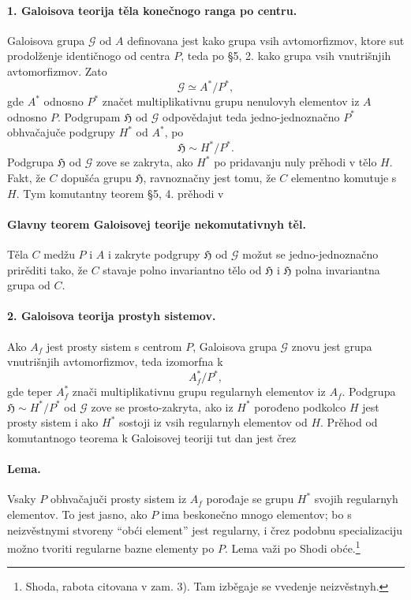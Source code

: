\documentclass[11pt]{article}
\providecommand{\Gcal}{\mathcal G}
\providecommand{\glqq}{``}
\providecommand{\grqq}{''}
\begin{document}
\paragraph{1. Galoisova teorija těla konečnogo ranga po centru.}
Galoisova grupa \(\Gcal\) od \(A\) definovana jest kako grupa vsih avtomorfizmov, ktore sut prodolženje identičnogo od centra \(P\), teda po §5, 2. kako grupa vsih vnutrišnjih avtomorfizmov. Zato
\[
        \Gcal \simeq A^*/P^*,
\]
gde \(A^*\) odnosno \(P^*\) značet multiplikativnu grupu nenulovyh elementov iz \(A\) odnosno \(P\). Podgrupam \(\mathfrak H\) od \(\Gcal\) odpovědajut teda jedno-jednoznačno \(P^*\) obhvačajuče podgrupy \(H^*\) od \(A^*\), po
\[
        \mathfrak H \sim H^*/P^* .
\]
Podgrupa \(\mathfrak H\) od \(\Gcal\) zove se zakryta, ako \(H^*\) po pridavanju nuly prěhodi v tělo \(H\). Fakt, že \(C\) dopušća grupu \(\mathfrak H\), ravnoznačny jest tomu, že \(C\) elementno komutuje s \(H\). Tym komutantny teorem §5, 4. prěhodi v

\paragraph{Glavny teorem Galoisovej teorije nekomutativnyh těl.}
Těla \(C\) medžu \(P\) i \(A\) i zakryte podgrupy \(\mathfrak H\) od \(\Gcal\) možut se jedno-jednoznačno prirěditi tako, že \(C\) stavaje polno invariantno tělo od \(\mathfrak H\) i \(\mathfrak H\) polna invariantna grupa od \(C\).

\paragraph{2. Galoisova teorija prostyh sistemov.}
Ako \(A_f\) jest prosty sistem s centrom \(P\), Galoisova grupa \(\Gcal\) znovu jest grupa vnutrišnjih avtomorfizmov, teda izomorfna k
\[
        A_f^*/P^*,
\]
gde teper \(A_f^*\) znači multiplikativnu grupu regularnyh elementov iz \(A_f\). Podgrupa \(\mathfrak H\sim H^*/P^*\) od \(\Gcal\) zove se prosto-zakryta, ako iz \(H^*\) porođeno podkolco \(H\) jest prosty sistem i ako \(H^*\) sostoji iz vsih regularnyh elementov od \(H\). Prěhod od komutantnogo teorema k Galoisovej teoriji tut dan jest črez

\paragraph{Lema.}
Vsaky \(P\) obhvačajuči prosty sistem iz \(A_f\) porođaje se grupu \(H^*\) svojih regularnyh elementov. To jest jasno, ako \(P\) ima beskonečno mnogo elementov; bo s neizvěstnymi stvoreny \glqq{}obći element\grqq{} jest regularny, i črez podobnu specializaciju možno tvoriti regularne bazne elementy po \(P\). Lema važi po Shodi obće.\footnote{Shoda, rabota citovana v zam. 3). Tam izběgaje se vvedenje neizvěstnyh.}
\end{document}
